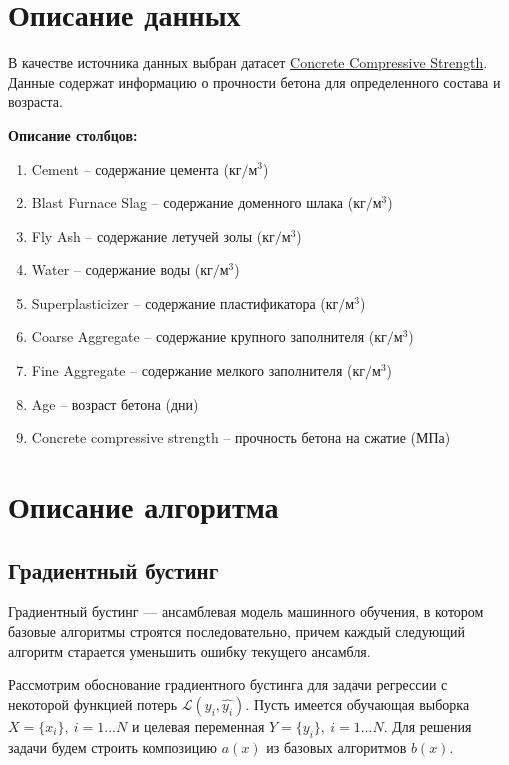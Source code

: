 \section{Описание данных}
В качестве источника данных выбран датасет \href{https://www.kaggle.com/datasets/niteshyadav3103/concrete-compressive-strength}{Concrete Compressive Strength}. Данные содержат информацию о прочности бетона для определенного состава и возраста.

\textbf{Описание столбцов:}
\begin{enumerate}
	\item Cement -- содержание цемента ($\text{кг}/\text{м}^3$)
	\item Blast Furnace Slag -- содержание доменного шлака ($\text{кг}/\text{м}^3$)
	\item Fly Ash -- содержание летучей золы ($\text{кг}/\text{м}^3$)
	\item Water -- содержание воды ($\text{кг}/\text{м}^3$)
	\item Superplasticizer -- содержание пластификатора ($\text{кг}/\text{м}^3$)
	\item Coarse Aggregate -- содержание крупного заполнителя ($\text{кг}/\text{м}^3$)
	\item Fine Aggregate -- содержание мелкого заполнителя ($\text{кг}/\text{м}^3$)
	\item Age -- возраст бетона (дни)
	\item Concrete compressive strength -- прочность бетона на сжатие ($\text{МПа}$)
\end{enumerate}
\pagebreak

\section{Описание алгоритма}
\subsection*{Градиентный бустинг}
Градиентный бустинг --- ансамблевая модель машинного обучения, в котором базовые алгоритмы строятся последовательно, причем каждый следующий алгоритм старается уменьшить ошибку текущего ансамбля.

Рассмотрим обоснование градиентного бустинга для задачи регрессии с некоторой функцией потерь $\mathcal{L}(y_i, \hat{y_i})$. Пусть имеется обучающая выборка $X = \{x_i\},\ i = 1...N$ и целевая переменная $Y = \{y_i\},\ i = 1...N$. Для решения задачи будем строить композицию $a(x)$ из базовых алгоритмов $b(x)$.

